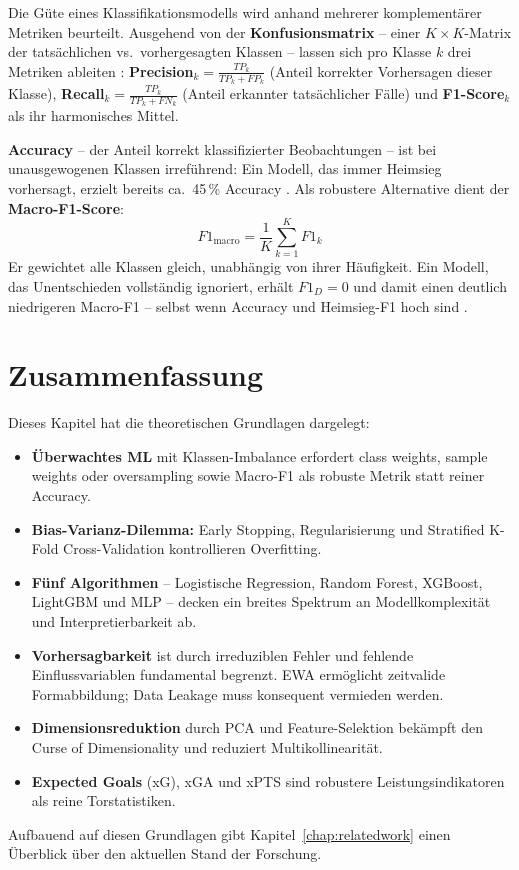 Die Güte eines Klassifikationsmodells wird anhand mehrerer komplementärer
Metriken beurteilt. Ausgehend von der \textbf{Konfusionsmatrix} -- einer
$K \times K$-Matrix der tatsächlichen vs.\ vorhergesagten Klassen --
lassen sich pro Klasse $k$ drei Metriken ableiten \cite{Powers2020}:
\textbf{Precision}$_k = \frac{TP_k}{TP_k + FP_k}$ (Anteil korrekter
Vorhersagen dieser Klasse), \textbf{Recall}$_k = \frac{TP_k}{TP_k + FN_k}$
(Anteil erkannter tatsächlicher Fälle) und \textbf{F1-Score}$_k$ als
ihr harmonisches Mittel.

\textbf{Accuracy} -- der Anteil korrekt klassifizierter Beobachtungen --
ist bei unausgewogenen Klassen irreführend: Ein Modell, das immer
\glqq Heimsieg\grqq{} vorhersagt, erzielt bereits ca.\ 45\,\% Accuracy
\cite{Powers2020}. Als robustere Alternative dient der
\textbf{Macro-F1-Score}:
\begin{equation}
    F1_{\text{macro}} = \frac{1}{K} \sum_{k=1}^{K} F1_k
\end{equation}
Er gewichtet alle Klassen gleich, unabhängig von ihrer Häufigkeit.
Ein Modell, das Unentschieden vollständig ignoriert, erhält $F1_D = 0$
und damit einen deutlich niedrigeren Macro-F1 -- selbst wenn Accuracy
und Heimsieg-F1 hoch sind \cite{Powers2020,HeGarcia2009}.

\section{Zusammenfassung}
\label{sec:zusammenfassung-grundlagen}

Dieses Kapitel hat die theoretischen Grundlagen dargelegt:

\begin{itemize}
    \item \textbf{Überwachtes ML} mit Klassen-Imbalance erfordert class
          weights, sample weights oder oversampling sowie Macro-F1 als
          robuste Metrik statt reiner Accuracy.
    \item \textbf{Bias-Varianz-Dilemma:} Early Stopping, Regularisierung
          und Stratified K-Fold Cross-Validation kontrollieren Overfitting.
    \item \textbf{Fünf Algorithmen} -- Logistische Regression, Random Forest,
          XGBoost, LightGBM und MLP -- decken ein breites Spektrum an
          Modellkomplexität und Interpretierbarkeit ab.
    \item \textbf{Vorhersagbarkeit} ist durch irreduziblen Fehler und
          fehlende Einflussvariablen fundamental begrenzt. EWA ermöglicht
          zeitvalide Formabbildung; Data Leakage muss konsequent vermieden
          werden.
    \item \textbf{Dimensionsreduktion} durch PCA und Feature-Selektion
          bekämpft den Curse of Dimensionality und reduziert Multikollinearität.
    \item \textbf{Expected Goals} (xG), xGA und xPTS sind robustere
          Leistungsindikatoren als reine Torstatistiken.
\end{itemize}

Aufbauend auf diesen Grundlagen gibt Kapitel~\ref{chap:relatedwork}
einen Überblick über den aktuellen Stand der Forschung.